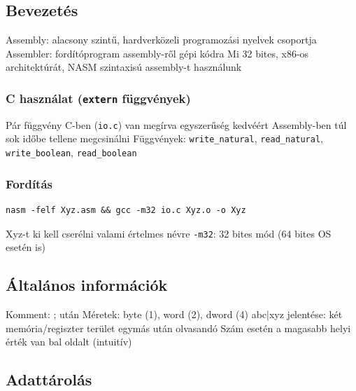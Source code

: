\documentclass[12pt,a4paper]{article}
\begin{document}
\subsection{Bevezetés}

\begin{outline}
	\1 Assembly: alacsony szintű, hardverközeli programozási nyelvek csoportja
	\1 Assembler: fordítóprogram assembly-ről gépi kódra
	\1 Mi 32 bites, x86-os architektúrát, NASM szintaxisú assembly-t használunk
\end{outline}

\subsubsection{C használat (\texttt{extern} függvények)}

\begin{outline}
	\1 Pár függvény C-ben (\texttt{io.c}) van megírva egyszerűség kedvéért
		\2 Assembly-ben túl sok időbe tellene megcsinálni
	\1 Függvények: \texttt{write\_natural}, \texttt{read\_natural},
	\texttt{write\_boolean}, \texttt{read\_boolean}
\end{outline}

\subsubsection{Fordítás}

\begin{outline}
	\1 \begin{verbatim}nasm -felf Xyz.asm && gcc -m32 io.c Xyz.o -o Xyz\end{verbatim}
	\1 Xyz-t ki kell cserélni valami értelmes névre
	\1 \texttt{-m32}: 32 bites mód (64 bites OS esetén is)
\end{outline}

\subsection{Általános információk}

\begin{outline}
	\1 Komment: ; után
	\1 Méretek: byte (1), word (2), dword (4)
	\1 abc|xyz jelentése: két memória/regiszter terület egymás után olvasandó
		\2 Szám esetén a magasabb helyi érték van bal oldalt (intuitív)
\end{outline}

\pagebreak

\subsection{Adattárolás}
\end{document}
